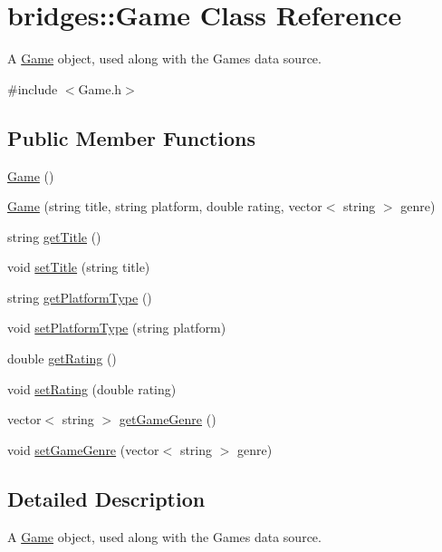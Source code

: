 \hypertarget{classbridges_1_1_game}{}\section{bridges\+:\+:Game Class Reference}
\label{classbridges_1_1_game}


A \mbox{\hyperlink{classbridges_1_1_game}{Game}} object, used along with the Games data source.  




{\ttfamily \#include $<$Game.\+h$>$}

\subsection*{Public Member Functions}
\begin{DoxyCompactItemize}
\item 
\mbox{\hyperlink{classbridges_1_1_game_a44f625a03ebf144931aa9e7e5440303c}{Game}} ()
\item 
\mbox{\hyperlink{classbridges_1_1_game_ab8064a35bca85871e7088f351ce86af1}{Game}} (string title, string platform, double rating, vector$<$ string $>$ genre)
\item 
string \mbox{\hyperlink{classbridges_1_1_game_a66917b204312a7996585e5d4b56a1add}{get\+Title}} ()
\item 
void \mbox{\hyperlink{classbridges_1_1_game_a6cfbd26183eb1202ea29b9f005dfb76b}{set\+Title}} (string title)
\item 
string \mbox{\hyperlink{classbridges_1_1_game_a6b7ff7e0fa411787338c70942cf0ebcb}{get\+Platform\+Type}} ()
\item 
void \mbox{\hyperlink{classbridges_1_1_game_a30d2c5800f2f3696162f5a3295325a3e}{set\+Platform\+Type}} (string platform)
\item 
double \mbox{\hyperlink{classbridges_1_1_game_a8deb9c403f2e16bede39a1486829742d}{get\+Rating}} ()
\item 
void \mbox{\hyperlink{classbridges_1_1_game_a0b9b3180975b2d3028b9090559bb6624}{set\+Rating}} (double rating)
\item 
vector$<$ string $>$ \mbox{\hyperlink{classbridges_1_1_game_a163f4abb299d588a5987c24e4e7bea05}{get\+Game\+Genre}} ()
\item 
void \mbox{\hyperlink{classbridges_1_1_game_a973e89486663131ab9095c93d4d62e81}{set\+Game\+Genre}} (vector$<$ string $>$ genre)
\end{DoxyCompactItemize}


\subsection{Detailed Description}
A \mbox{\hyperlink{classbridges_1_1_game}{Game}} object, used along with the Games data source. 

